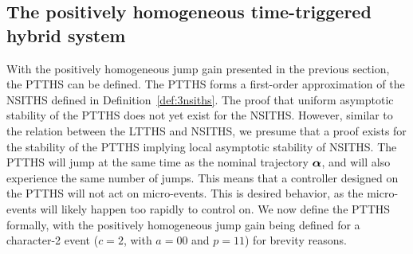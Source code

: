 \documentclass[../DC2017114Bouma.tex]{subfiles}
\begin{document}

\subsection{The positively homogeneous time-triggered hybrid system}\label{def:4PTTHS}
With the positively homogeneous jump gain presented in the previous section, the PTTHS can be defined. The PTTHS forms a first-order approximation of the NSITHS defined in Definition~\ref{def:3nsiths}. The proof that uniform asymptotic stability of the PTTHS does not yet exist for the NSITHS. However, similar to the relation between the LTTHS and NSITHS, we presume that a proof exists for the stability of the PTTHS implying local asymptotic stability of NSITHS. The PTTHS will jump at the same time as the nominal trajectory $\boldsymbol{\alpha}$, and will also experience the same number of jumps. This means that a controller designed on the PTTHS will not act on micro-events. This is desired behavior, as the micro-events will likely happen too rapidly to control on. We now define the PTTHS formally, with the positively homogeneous jump gain being defined for a character-2 event ($c = 2$, with $a = 00$ and $p=11$) for brevity reasons.
\end{document}
